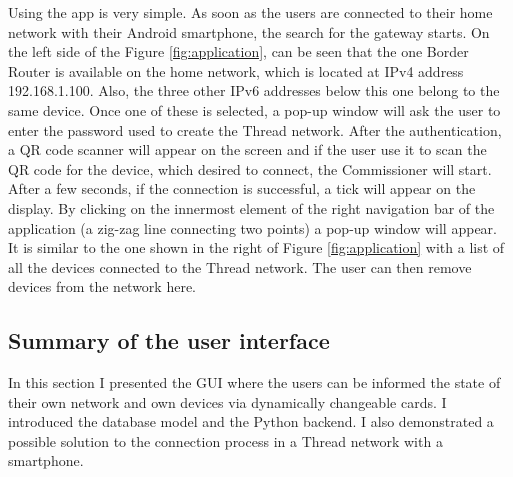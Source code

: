 Using the app is very simple. As soon as the users are connected to their home network with their Android smartphone, the search for the gateway starts. On the left side of the Figure \ref{fig:application}, can be seen that the one Border Router is available on the home network, which is located at IPv4 address 192.168.1.100. Also, the three other IPv6 addresses below this one belong to the same device. Once one of these is selected, a pop-up window will ask the user to enter the password used to create the Thread network. After the authentication, a QR code scanner will appear on the screen and if the user use it to scan the QR code for the device, which desired to connect, the Commissioner will start. After a few seconds, if the connection is successful, a tick will appear on the display. By clicking on the innermost element of the right navigation bar of the application (a zig-zag line connecting two points) a pop-up window will appear. It is similar to the one shown in the right of Figure \ref{fig:application} with a list of all the devices connected to the Thread network. The user can then remove devices from the network here.

\subsection{Summary of the user interface}
In this section I presented the GUI where the users can be informed the state of their own network and own devices via dynamically changeable cards. I introduced the database model and the Python backend. I also demonstrated a possible solution to the connection process in a Thread network with a smartphone.